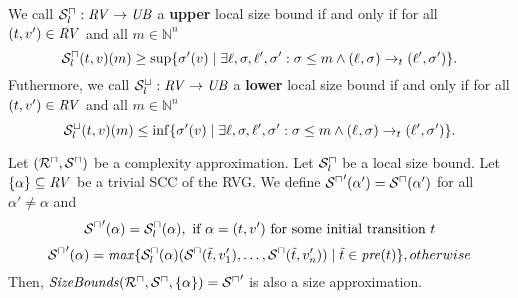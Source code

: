 \begin{definition}
  We call ${\mathcal{S}^\sqcap_l}: \mathit{RV} \rightarrow \mathit{UB}$ a \textbf{upper} local size bound if and only if for all $(t, v') \in \mathit{RV}$ and all $m \in \mathbb{N}^n$
  \[ {\mathcal{S}^\sqcap_l}(t, v)(m) \geq \sup \lbrace \sigma'(v) \mid \exists \ell, \sigma, \ell', \sigma': \sigma \leq m \wedge (\ell_{}, \sigma_{}) \rightarrow_t (\ell', \sigma') \rbrace. \]
  Futhermore, we call ${\mathcal{S}^\sqcup_l}: \mathit{RV} \rightarrow \mathit{UB}$ a \textbf{lower} local size bound if and only if for all $(t, v') \in \mathit{RV}$ and all $m \in \mathbb{N}^n$
  \[ {\mathcal{S}^\sqcup_l}(t, v)(m) \leq \inf \lbrace \sigma'(v) \mid \exists \ell, \sigma, \ell', \sigma': \sigma \leq m \wedge (\ell_{}, \sigma_{}) \rightarrow_t (\ell', \sigma') \rbrace. \]
  
\end{definition}

\begin{theorem}
  Let $({\mathcal{R}^\sqcap}, {\mathcal{S}^\sqcap})$ be a complexity approximation.
  Let ${\mathcal{S}^\sqcap_l}$ be a local size bound.
  Let $\lbrace \alpha \rbrace \subseteq \mathit{RV}$ be a trivial SCC of the RVG.
  We define ${\mathcal{S}^\sqcap}'(\alpha') = {\mathcal{S}^\sqcap}(\alpha')$ for all $\alpha' \neq \alpha$ and
  \[ {\mathcal{S}^\sqcap}'(\alpha) = {\mathcal{S}^\sqcap_l}(\alpha), \text{ if } \alpha = (t, v') \text{ for some initial transition } t \]
  \[ {\mathcal{S}^\sqcap}'(\alpha) = \mathit{max} \lbrace  {\mathcal{S}^\sqcap_l}(\alpha)( {\mathcal{S}^\sqcap}(\tilde{t}, v'_1), \dots, {\mathcal{S}^\sqcap}(\tilde{t}, v'_n)) \mid \tilde{t} \in \mathit{pre}(t) \rbrace, otherwise \]
  Then, $\mathit{SizeBounds}({\mathcal{R}^\sqcap}, {\mathcal{S}^\sqcap}, \lbrace \alpha \rbrace) = {\mathcal{S}^\sqcap}'$ is also a size approximation.
\end{theorem}

